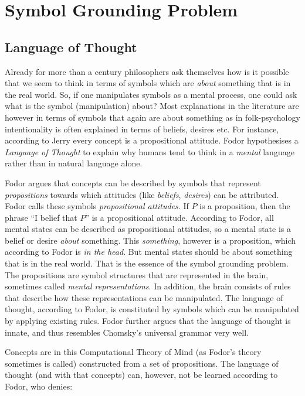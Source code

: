 \section{Symbol Grounding Problem}

\subsection{Language of Thought}

Already for more than a century philosophers ask themselves how is it possible that we seem to think in terms of symbols which are {\em about} something that is in the real world. So, if one manipulates symbols as a mental process, one could ask what is the symbol (manipulation) about? Most explanations in the literature are however in terms of symbols that again are about something as in folk-psychology intentionality is often explained in terms of beliefs, desires etc. For instance, according to Jerry \citet{fodor:1975} every concept is a propositional attitude. Fodor hypothesises a {\em Language of Thought} to explain why humans tend to think in a {\em mental} language rather than in natural language alone.

Fodor argues that concepts can be described by symbols that represent {\em propositions} towards which attitudes (like {\em beliefs}, {\em desires}) can be attributed. Fodor calls these symbols {\em propositional attitudes}. If $P$ is a proposition, then the phrase ``I belief that $P$'' is a propositional attitude. According to Fodor, all mental states can be described as propositional attitudes, so a mental state is a belief or desire {\em about} something. This {\em something}, however is a proposition, which according to Fodor is {\em in the head}. But mental states should be about something that is in the real world. That is the essence of the symbol grounding problem. The propositions are symbol structures that are represented in the brain, sometimes called {\em mental representations}. In addition, the brain consists of rules that describe how these representations can be manipulated. The language of thought, according to Fodor, is constituted by symbols which can be manipulated by applying existing rules. Fodor further argues that the language of thought is innate, and thus resembles Chomsky's universal grammar very well.

Concepts are in this Computational Theory of Mind (as Fodor's theory sometimes is called) constructed from a set of propositions. The language of thought (and with that concepts) can, however, not be learned according to Fodor, who denies:

